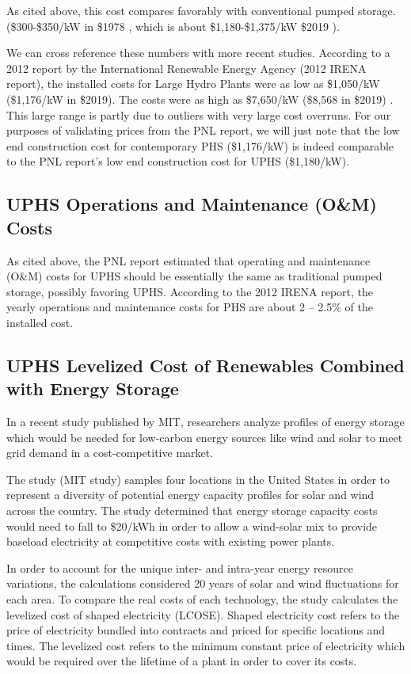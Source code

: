 \documentclass[hidelinks,12pt,a4paper]{article}
\begin{document}
As cited above, this cost compares favorably with conventional pumped storage. (\$300-\$350/kW in \$1978 \cite{UndergroundPumpedHydroelectricStorage}, which is about \$1,180-\$1,375/kW \$2019 \cite{CPIInflationCalculator}).

We can cross reference these numbers with more recent studies. According to a 2012 report by the International Renewable Energy Agency (2012 IRENA report), the installed costs for Large Hydro Plants were as low as \$1,050/kW (\$1,176/kW in \$2019). The costs were as high as \$7,650/kW (\$8,568 in \$2019) \cite{RenewableEnergyTechnologiesCostAnalysisSeries}. This large range is partly due to outliers with very large cost overruns. For our purposes of validating prices from the PNL report, we will just note that the low end construction cost for contemporary PHS (\$1,176/kW) is indeed comparable to the PNL report's low end construction cost for UPHS (\$1,180/kW).

\subsection{UPHS Operations and Maintenance (O\&M) Costs}
As cited above, the PNL report estimated that operating and maintenance (O\&M) costs for UPHS should be essentially the same as traditional pumped storage, possibly favoring UPHS. \cite{UndergroundPumpedHydroelectricStorage} According to the 2012 IRENA report, the yearly operations and maintenance costs for PHS are about 2 – 2.5\% of the installed cost.

\subsection{UPHS Levelized Cost of Renewables Combined with Energy Storage}
In a recent study published by MIT, researchers analyze profiles of energy storage which would be needed for low-carbon energy sources like wind and solar to meet grid demand in a cost-competitive market.

The study (MIT study) samples four locations in the United States in order to represent a diversity of potential energy capacity profiles for solar and wind across the country. The study determined that energy storage capacity costs would need to fall to \$20/kWh in order to allow a wind-solar mix to provide baseload electricity at competitive costs with existing power plants.

In order to account for the unique inter- and intra-year energy resource variations, the calculations considered 20 years of solar and wind fluctuations for each area. To compare the real costs of each technology, the study calculates the levelized cost of shaped electricity (LCOSE). Shaped electricity cost refers to the price of electricity bundled into contracts and priced for specific locations and times. The levelized cost refers to the minimum constant price of electricity which would be required over the lifetime of a plant in order to cover its costs.
\end{document}
